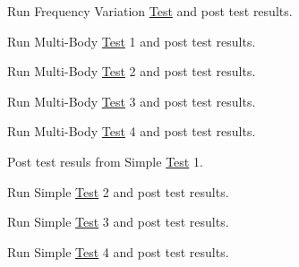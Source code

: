 
\begin{DoxyRefList}
\item[\label{test__test000009}%
\hypertarget{test__test000009}{}%
Page \hyperlink{_test_frequency}{Frequency Variation Test} ]Run Frequency Variation \hyperlink{class_test}{Test} and post test results. 
\item[\label{test__test000001}%
\hypertarget{test__test000001}{}%
Page \hyperlink{_multi_body_test1}{Multi-\/body Test 1} ]Run Multi-\/\-Body \hyperlink{class_test}{Test} 1 and post test results. 
\item[\label{test__test000002}%
\hypertarget{test__test000002}{}%
Page \hyperlink{_multi_body_test2}{Multi-\/body Test 2} ]Run Multi-\/\-Body \hyperlink{class_test}{Test} 2 and post test results. 
\item[\label{test__test000003}%
\hypertarget{test__test000003}{}%
Page \hyperlink{_multi_body_test3}{Multi-\/body Test 3} ]Run Multi-\/\-Body \hyperlink{class_test}{Test} 3 and post test results. 
\item[\label{test__test000004}%
\hypertarget{test__test000004}{}%
Page \hyperlink{_multi_body_test4}{Multi-\/body Test 4} ]Run Multi-\/\-Body \hyperlink{class_test}{Test} 4 and post test results. 
\item[\label{test__test000005}%
\hypertarget{test__test000005}{}%
Page \hyperlink{_simple_test1}{Simple Test 1} ]Post test resuls from Simple \hyperlink{class_test}{Test} 1. 
\item[\label{test__test000006}%
\hypertarget{test__test000006}{}%
Page \hyperlink{_simple_test2}{Simple Test 2} ]Run Simple \hyperlink{class_test}{Test} 2 and post test results. 
\item[\label{test__test000007}%
\hypertarget{test__test000007}{}%
Page \hyperlink{_simple_test3}{Simple Test 3} ]Run Simple \hyperlink{class_test}{Test} 3 and post test results. 
\item[\label{test__test000008}%
\hypertarget{test__test000008}{}%
Page \hyperlink{_simple_test4}{Simple Test 4} ]Run Simple \hyperlink{class_test}{Test} 4 and post test results.
\end{DoxyRefList}